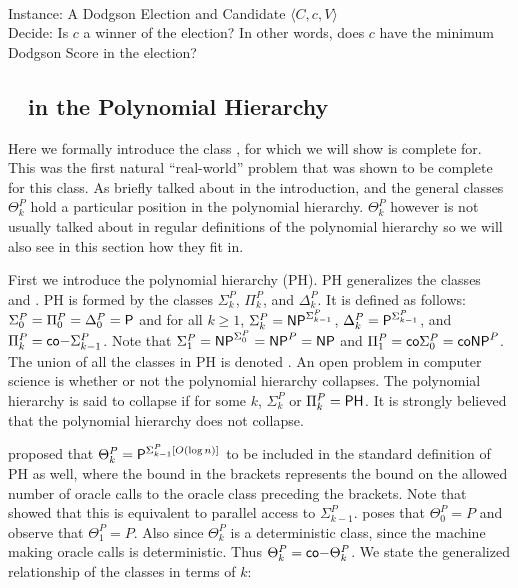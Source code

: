 \begin{problem}{} \\
    \tab Instance: A Dodgson Election and Candidate $\langle C,c,V \rangle$ \\
    \tab Decide: Is $c$ a winner of the election?
    In other words, does $c$ have the minimum Dodgson Score in the election?

\end{problem}


\subsection{\tp~ in the Polynomial Hierarchy}

Here we formally introduce the class \tp, for which
we will show \dwin is complete for.
This was the first natural ``real-world'' problem that was shown to be complete
for this class.
As briefly talked about in the introduction, \tp and the
general classes $\Theta_{k}^P$ hold a particular position
in the polynomial hierarchy.
$\Theta_{k}^P$ however is not usually talked about in regular definitions of
the polynomial hierarchy so we will also see in this section how they fit in.

First we introduce the polynomial hierarchy (PH).
PH generalizes the classes \np~ and .
PH is formed by the classes $\Sigma_k^P$, $\Pi_k^P$, and $\Delta_k^P$.
It is defined as follows: $\Sigma_0^P = \Pi_0^P = \Delta_0^P = \mathsf{P}$ and
for all $k \geq 1$,
$\Sigma_k^P = \mathsf{NP}^{\Sigma_{k-1}^P}$,
$\Delta_k^P = \mathsf{P}^{\Sigma_{k-1}^P}$, and
$\Pi_k^P = \mathsf{co-}\Sigma_{k-1}^P$.
Note that
$\Sigma_1^P = \mathsf{NP}^{\Sigma_{0}^P} = \mathsf{NP}^{P} = \mathsf{NP}$
and $\Pi_1^P = \mathsf{co}{\Sigma_{0}^P} = \mathsf{coNP}^{P}$.
The union of all the classes in PH is denoted .
An open problem in computer science is whether or not
the polynomial hierarchy collapses.
The polynomial hierarchy is said to collapse if for some $k$, $\Sigma_k^P$ or $\Pi_k^P = \mathsf{PH}$.
It is strongly believed that the
polynomial hierarchy does not collapse.

\citet{PZ83} proposed that $\Theta_{k}^P = \mathsf{P}^{\Sigma_{k-1}^P
[O(\log n)]}$ to be included in the standard definition of PH as well,
where the bound in the brackets represents the bound on the allowed
number of oracle calls to the oracle class preceding the brackets.
Note that \citet{hem87} showed that this is equivalent to parallel
access to $\Sigma_{k-1}^P$.
\citet{compsat} poses that $\Theta_0^P = P$ and observe that
$\Theta_1^P = P$.
Also since $\Theta_{k}^P$ is a deterministic class, since the
machine making oracle calls is deterministic.
Thus $\Theta_{k}^P = \mathsf{co-}\Theta_{k}^P$.
We state the generalized relationship of the classes in terms of
$k$:

